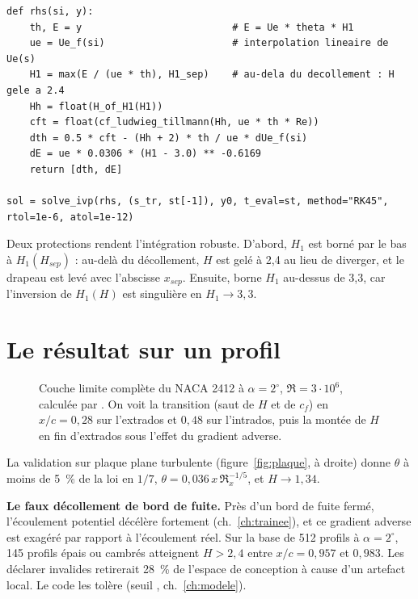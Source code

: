 \begin{codebox}
\begin{lstlisting}
def rhs(si, y):
    th, E = y                          # E = Ue * theta * H1
    ue = Ue_f(si)                      # interpolation lineaire de Ue(s)
    H1 = max(E / (ue * th), H1_sep)    # au-dela du decollement : H gele a 2.4
    Hh = float(H_of_H1(H1))
    cft = float(cf_ludwieg_tillmann(Hh, ue * th * Re))
    dth = 0.5 * cft - (Hh + 2) * th / ue * dUe_f(si)
    dE = ue * 0.0306 * (H1 - 3.0) ** -0.6169
    return [dth, dE]

sol = solve_ivp(rhs, (s_tr, st[-1]), y0, t_eval=st, method="RK45", rtol=1e-6, atol=1e-12)
\end{lstlisting}
Deux protections rendent l'intégration robuste. D'abord, $H_1$ est borné par le bas à $H_1(H_{sep})$ : au-delà du décollement, $H$ est gelé à 2,4 au lieu de diverger, et le drapeau  est levé avec l'abscisse $x_{sep}$. Ensuite,  borne $H_1$ au-dessus de 3,3, car l'inversion de $H_1(H)$ est singulière en $H_1\to3{,}3$.
\end{codebox}

\section{Le résultat sur un profil}
\begin{figure}[htbp]
\centering

\caption{Couche limite complète du NACA 2412 à $\alpha=2^\circ$, $\Re=3\cdot10^6$, calculée par . On voit la transition (saut de $H$ et de $c_f$) en $x/c=0{,}28$ sur l'extrados et $0{,}48$ sur l'intrados, puis la montée de $H$ en fin d'extrados sous l'effet du gradient adverse.}\label{fig:bl-2412}
\end{figure}

La validation sur plaque plane turbulente (figure~\ref{fig:plaque}, à droite) donne $\theta$ à moins de 5~\% de la loi en $1/7$, $\theta=0{,}036\,x\,\Re_x^{-1/5}$, et $H\to1{,}34$.

\begin{piege}
\textbf{Le faux décollement de bord de fuite.} Près d'un bord de fuite fermé, l'écoulement potentiel décélère fortement (ch.~\ref{ch:trainee}), et ce gradient adverse est exagéré par rapport à l'écoulement réel. Sur la base de 512 profils à $\alpha=2^\circ$, 145 profils épais ou cambrés atteignent $H>2{,}4$ entre $x/c=0{,}957$ et $0{,}983$. Les déclarer invalides retirerait 28~\% de l'espace de conception à cause d'un artefact local. Le code les tolère (seuil , ch.~\ref{ch:modele}).
\end{piege}

